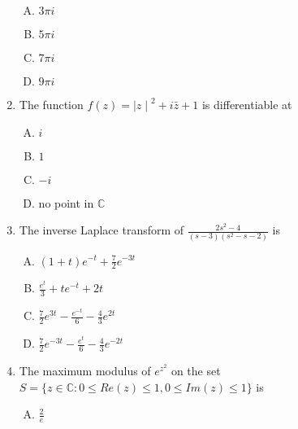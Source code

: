 \documentclass[12pt,a4paper]{article}
\begin{document}
\begin{enumerate}
\begin{enumerate}[(A)]

\item $
3 \pi i
$

\item $
5 \pi i
$

\item $
7 \pi i
$

\item $
9 \pi i
$

\end{enumerate}

\item The function $f(z)= {\mid z \mid}^2 + i \bar{z} + 1 $ is differentiable at

\begin{enumerate}[(A)]

\item $
i
$

\item $
1
$

\item $
-i
$

\item 
no point in $ \mathbb{C}
$

\end{enumerate}

\item The inverse Laplace transform of $ \frac{2s^2-4}{(s-3)(s^2-s-2)} $ is

\begin{enumerate}[(A)]

\item $
(1+t)e^{-t} + \frac{7}{2} e^{-3t} 
$

\item $
\frac{e^t}{3} + t e^{-t} + 2t
$

\item $
\frac{7}{2} e^{3t} - \frac{e^{-t}}{6} - \frac{4}{3} e^{2t}
$

\item $
\frac{7}{2} e^{-3t} - \frac{e^{t}}{6} - \frac{4}{3} e^{-2t}
$

\end{enumerate}

\item The maximum modulus of $ e^ {z^2} $ on the set $S = \lbrace z \in \mathbb{C} : 0 \leq Re(z) \leq 1, 0 \leq Im(z) \leq 1 \rbrace $ is

\begin{enumerate}[(A)]

\item $
\frac{2}{e}
$


\end{enumerate}
\end{enumerate}
\end{document}
